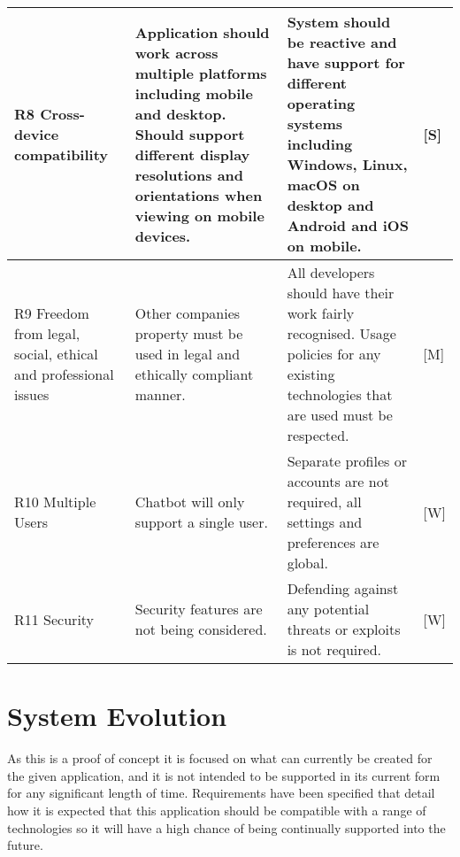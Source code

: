 \documentclass{IEEEtran}
\begin{document}
\begin{center}
\begin{longtable}{ | m{3cm} | m{7cm} | m{7cm} | m{0.5cm} | }
		R8 Cross-device compatibility & 
		Application should work across multiple platforms including mobile and desktop. Should support different display resolutions and orientations when viewing on mobile devices. & 
		System should be reactive and have support for different operating systems including Windows, Linux, macOS on desktop and Android and iOS on mobile. & 
		[S] \\
		
		\hline
		
		R9 Freedom from legal, social, ethical and professional issues & 
		Other companies property must be used in legal and ethically compliant manner. & 
		All developers should have their work fairly recognised. Usage policies for any existing technologies that are used must be respected. &
		[M] \\
		
		\hline
		
		R10 Multiple Users & 
		Chatbot will only support a single user. & 
		Separate profiles or accounts are not required, all settings and preferences are global. & 
		[W] \\
		
		\hline
		
		R11 Security & 
		Security features are not being considered. & 
		Defending against any potential threats or exploits is not required. & 
		[W] \\
		
		\hline
		
	\end{longtable}
	\end{center}
	
	\section{System Evolution}
	As this is a proof of concept it is focused on what can currently be created for the given application, and it is not intended to be supported in its current form for any significant length of time. Requirements have been specified that detail how it is expected that this application should be compatible with a range of technologies so it will have a high chance of being continually supported into the future. 



\end{document}

